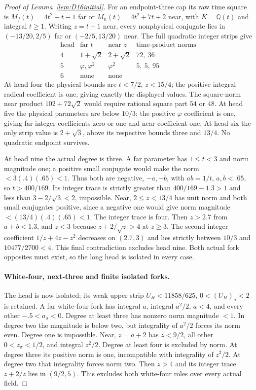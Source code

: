 \documentclass[11pt]{article}
\begin{document}
\begin{proof}[Proof of Lemma~\ref{lem:D16initial}]
For an endpoint-three cap its raw time square is
$M_f(t)=4t^2+t-1$ far or $M_n(t)=4t^2+7t+2$ near,
with $K=\mathbb Q(t)$ and integral $t\ge1$.
Writing $z=t+1$ near, every nonphysical conjugate lies in
$(-13/20,2/5)$ far or $(-2/5,13/20)$ near.
The full quadratic integer strips give
\[
\begin{array}{c|c|c|c}
\text{head}&\text{far }t&\text{near }z&\text{time-product norms}\\\hline
4&1+\sqrt2&2+\sqrt2&72,\ 36\\
5&\varphi,\varphi^2&\varphi^2&5,\ 5,\ 95\\
6&\text{none}&\text{none}&
\end{array}
\]
At head four the physical bounds are $t<7/2$, $z<15/4$;
the positive integral radical coefficient is one, giving exactly
the displayed values. The square-norm near product
$102+72\sqrt2$ would require rational square part $54$ or $48$.
At head five the physical parameters are below $10/3$; the
positive $\varphi$ coefficient is one, giving far integer coefficients
zero or one and near coefficient one. At head six the only strip
value is $2+\sqrt3$, above its respective bounds three and $13/4$.
No quadratic endpoint survives.

At head nine the actual degree is three. A far parameter has
$1\le t<3$ and norm magnitude one; a positive small conjugate would
make the norm $<3(.4)(.65)<1$. Thus both are negative, $-a,-b$,
with $ab=1/t$, $a,b<.65$, so $t>400/169$.
Its integer trace is strictly greater than
$400/169-1.3>1$ and less than $3-2/\sqrt3<2$, impossible.
Near, $2\le z<13/4$ has unit norm and both small conjugates positive,
since a negative one would give norm magnitude
$<(13/4)(.4)(.65)<1$.
The integer trace is four. Then $z>2.7$ from $a+b<1.3$,
and $z<3$ because $z+2/\sqrt z>4$ at $z\ge3$.
The second integer coefficient $1/z+4z-z^2$ decreases on
$(2.7,3)$ and lies strictly between $10/3$ and $10477/2700<4$.
This final contradiction excludes head nine. Both actual fork
opposites must exist, so the long head is isolated in every case.

\paragraph{White-four, next-three and finite isolated forks.}
The head is now isolated; its weak upper strip
$U_H<11858/625$, $0<(U_H)_\sigma<2$ is retained.
A far white-four fork has integral $a$, integral $a^2/2$,
$a<4$, and every other $-.5<a_\sigma<0$.
Degree at least three has nonzero norm magnitude $<1$.
In degree two the magnitude is below two, but integrality of
$a^2/2$ forces its norm even. Degree one is impossible.
Near, $z=a+2$ has $z<9/2$, all other $0<z_\sigma<1/2$,
and integral $z^2/2$. Degree at least four is excluded by norm.
At degree three its positive norm is one, incompatible with
integrality of $z^2/2$. At degree two that integrality forces norm
two. Then $z>4$ and its integer trace $z+2/z$ lies in $(9/2,5)$.
This excludes both white-four roles over every actual field.


\end{proof}
\end{document}
